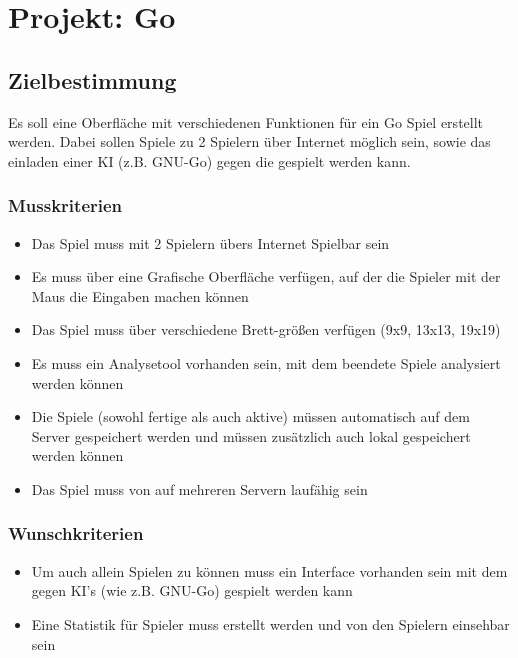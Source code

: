 \chapter{Projekt: Go}

\section{Zielbestimmung}

Es soll eine Oberfläche mit verschiedenen Funktionen für ein Go Spiel erstellt werden. Dabei sollen Spiele zu 2 Spielern über Internet möglich sein, sowie das einladen einer KI (z.B. GNU-Go) gegen die gespielt werden kann.

\subsection{Musskriterien}

\begin{itemize}
	\item Das Spiel muss mit 2 Spielern übers Internet Spielbar sein
	\item Es muss über eine Grafische Oberfläche verfügen, auf der die Spieler mit der Maus die Eingaben machen können
	\item Das Spiel muss über verschiedene Brett-größen verfügen (9x9, 13x13, 19x19)
	\item Es muss ein Analysetool vorhanden sein, mit dem beendete Spiele analysiert werden können
	\item Die Spiele (sowohl fertige als auch aktive) müssen automatisch auf dem Server gespeichert werden und müssen zusätzlich auch lokal gespeichert werden können
	\item Das Spiel muss von auf mehreren Servern laufähig sein
\end{itemize}


\subsection{Wunschkriterien}

\begin{itemize}
	\item Um auch allein Spielen zu können muss ein Interface vorhanden sein mit dem gegen KI's (wie z.B. GNU-Go) gespielt werden kann
	\item Eine Statistik für Spieler muss erstellt werden und von den Spielern einsehbar sein
\end{itemize}


